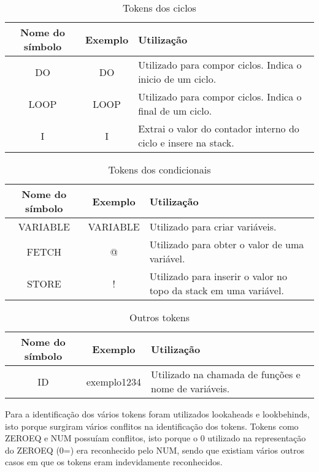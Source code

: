 \documentclass{article}
\begin{document}
\begin{table}[h]
    \centering
    \begin{tabular}{|c|c|p{6cm}|}
         \hline
         \textbf{Nome do símbolo}& \textbf{Exemplo} &\textbf{Utilização}\\
         \hline
         DO& DO & Utilizado para compor ciclos. Indica o inicio de um ciclo. \\ \hline
         LOOP& LOOP & Utilizado para compor ciclos. Indica o final de um ciclo.\\ \hline
         I& I & Extrai o valor do contador interno do ciclo e insere na stack.\\
         \hline 
    \end{tabular}
    \caption{Tokens dos ciclos}
    \label{tab:arit} 
\end{table}

\begin{table}[h]
    \centering
    \begin{tabular}{|c|c|p{6cm}|}
         \hline
         \textbf{Nome do símbolo}& \textbf{Exemplo} &\textbf{Utilização}\\
         \hline
         VARIABLE& VARIABLE & Utilizado para criar variáveis. \\ \hline
         FETCH& @ & Utilizado para obter o valor de uma variável.\\ \hline
         STORE& ! & Utilizado para inserir o valor no topo da stack em uma variável.\\
         \hline 
    \end{tabular}
    \caption{Tokens dos condicionais}
    \label{tab:arit} 
\end{table}

\begin{table}[h]
    \centering
    \begin{tabular}{|c|c|p{6cm}|}
         \hline
         \textbf{Nome do símbolo}& \textbf{Exemplo} &\textbf{Utilização}\\
         \hline
         ID& exemplo1234 & Utilizado na chamada de funções e nome de variáveis.\\
         \hline
    \end{tabular}
    \caption{Outros tokens}
    \label{tab:arit}
\end{table}


\FloatBarrier
Para a identificação dos vários tokens foram utilizados lookaheads e lookbehinds, isto porque surgiram vários conflitos na identificação dos tokens. Tokens como ZEROEQ e NUM possuíam conflitos, isto porque o 0 utilizado na representação do ZEROEQ (0=) era reconhecido pelo NUM, sendo que existiam vários outros casos em que os tokens eram indevidamente reconhecidos.
\end{document}
